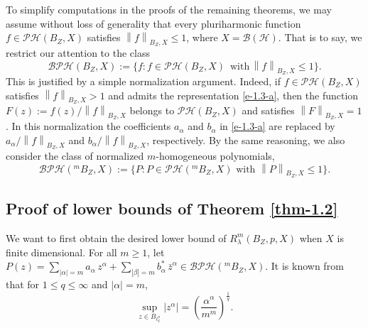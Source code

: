 \documentclass[a4paper,11pt, reqno]{amsart}
\theoremstyle{definition}
\newcounter {own}
\newcommand{\norm}[1]{\left\lVert#1\right\rVert}
\begin{document}
To simplify computations in the proofs of the remaining theorems, we may assume without loss of generality that every pluriharmonic function $f \in \mathcal{PH}(B_{Z},X)$ satisfies $\norm{f}_{B_{Z},X} \leq 1$, where $X=\mathcal{B}(\mathcal{H})$. That is to say, we restrict our attention to the class $$\mathcal{BPH}(B_{Z}, X):=\{f: f \in \mathcal{PH}(B_{Z},X)\, \mbox{ with}\, \norm{f}_{B_{Z},X} \leq 1\}.$$
This is justified by a simple normalization argument. Indeed, if $f\in \mathcal{PH}(B_{Z},X)$ satisfies $\norm{f}_{B_{Z},X} > 1$ and admits the representation \eqref{e-1.3-a}, then the function $F(z):=f(z)/\norm{f}_{B_{Z},X}$
belongs to $\mathcal{PH}(B_{Z},X)$ and satisfies $\norm{F}_{B_{Z},X} =1$. In this normalization the coefficients $a_{\alpha}$ and $b_{\alpha}$ in \eqref{e-1.3-a} are replaced by $a_{\alpha}/\norm{f}_{B_{Z},X}$ and $b_{\alpha}/\norm{f}_{B_{Z},X}$, respectively. By the same reasoning, we also consider the class of normalized $m$-homogeneous polynomials,
$$\mathcal{BPH}(^mB_{Z},X):=\{P: P \in \mathcal{PH}(^mB_{Z},X)\,\, \mbox{with}\,\, \norm{P}_{B_{Z},X} \leq 1\}.
$$
\subsection{Proof of lower bounds of Theorem \ref{thm-1.2}} 
	We want to first obtain the desired lower bound of $R^{m}_{\lambda}(B_{Z}, p,X)$ when $X$ is finite dimensional. For all $m\geq1$, let $P(z)=\sum_{|\alpha|=m} a_{\alpha}\, z^{\alpha} + \sum_{|\beta|=m} b^{*}_{\alpha}\, \bar{z}^{\alpha} \in \mathcal{BPH}(^mB_{Z},X)$. It is known from \cite[Lemma $3.5$]{defant-2004} that for $1 \le q \le \infty$ and $|\alpha| = m$,
	\[
	\sup_{z \in B_{\ell_q^n}} |z^\alpha|
	=
	\left(\frac{\alpha^\alpha}{m^m}\right)^{\frac{1}{q}}.
	\]
	
\end{document}
